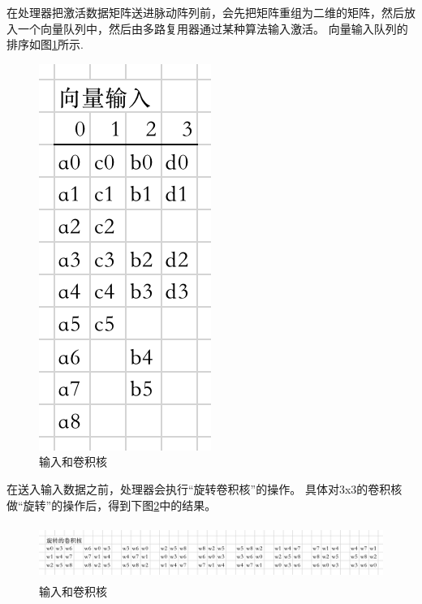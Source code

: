 在处理器把激活数据矩阵送进脉动阵列前，会先把矩阵重组为二维的矩阵，然后放入一个向量队列中，然后由多路复用器通过某种算法输入激活。
向量输入队列的排序如图\ref{fig:vector_inputs}所示.
\begin{figure}[htbp]
    \centering
    \includegraphics[]{figures/vector_inputs.png}
    \caption{输入和卷积核}
    \label{fig:vector_inputs}
\end{figure} 

在送入输入数据之前，处理器会执行“旋转卷积核”的操作。
具体对3x3的卷积核做“旋转”的操作后，得到下图\ref{fig:rotated_kernel}中的结果。
\begin{figure}[htbp]
    \centering
    \includegraphics[width=12cm,height=1.8cm]{figures/rotated_kernel.png}
    \caption{输入和卷积核}
    \label{fig:rotated_kernel}
\end{figure} 

